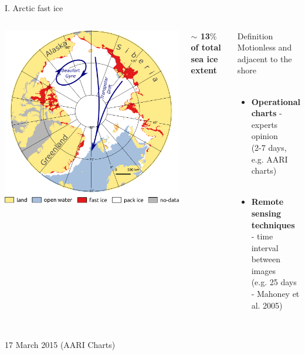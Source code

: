 \documentclass[8pt]{beamer}
\begin{document}
\setwatermark{\fontsize{125pt}{125pt}\selectfont{}}
\begin{frame}[fragile]{I. Arctic fast ice}
	\begin{columns}
		\includegraphics[width=1\textwidth]{./img/ArcticSI_Mar2015_FI_circ_names.pdf}\\
				\begin{block}{\centering}
					\begin{center}
						\textbf{$\sim$ 13$\%$ of total sea ice extent}
					\end{center}
				\end{block}
				
				\begin{block}{\centering Definition}
					\centering
				Motionless and adjacent to the shore\\~\\
					\begin{itemize}
						\item \textbf{Operational charts} - experts opinion\\
						 (2-7 days, e.g. AARI charts)\\~\\
						\item \textbf{Remote sensing techniques}\\ - time interval between images\\
						 (e.g. 25 days - Mahoney et al. 2005)
					\end{itemize}
				\end{block}

	\end{columns}
~\\

17 March 2015 (AARI Charts)
\end{frame}
\end{document}
